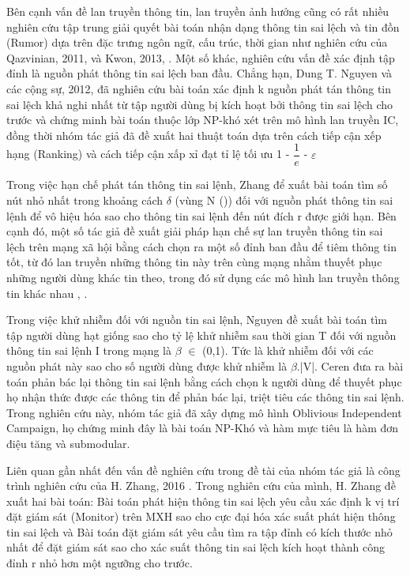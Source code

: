 Bên cạnh vấn đề lan truyền thông tin, lan truyền ảnh hưởng cũng có rất nhiều nghiên cứu tập trung giải quyết bài toán nhận dạng thông tin sai lệch và tin đồn (Rumor) dựa trên đặc trưng ngôn ngữ, cấu trúc, thời gian như nghiên cứu của Qazvinian, 2011, \cite{qazvin} và Kwon, 2013, \cite{kwon}. Một số khác, nghiên cứu vấn đề xác định tập đỉnh là nguồn phát thông tin sai lệch ban đầu. Chẳng hạn, Dung T. Nguyen và các cộng sự, 2012, \cite{nguyen1} đã nghiên cứu bài toán xác định k nguồn phát tán thông tin sai lệch khả nghi nhất từ tập người dùng bị kích hoạt bởi thông tin sai lệch cho trước và chứng minh bài toán thuộc lớp NP-khó xét trên mô hình lan truyền IC, đồng thời nhóm tác giả đã đề xuất hai thuật toán dựa trên cách tiếp cận xếp hạng (Ranking) và cách tiếp cận xấp xỉ đạt tỉ lệ tối ưu 1 - $\dfrac{1}{e}$ - $\varepsilon$

Trong việc hạn chế phát tán thông tin sai lệnh, Zhang \cite{zhang1} để xuất bài toán tìm số nút nhỏ nhất trong khoảng cách $\delta$ (vùng N$_{}$ ()) đối với nguồn phát thông tin sai lệnh để vô hiệu hóa sao cho thông tin sai lệnh đến nút đích r được giới hạn. Bên cạnh đó, một số tác giả đề xuất giải pháp hạn chế sự lan truyền thông tin sai lệch trên mạng xã hội bằng cách chọn ra một số đỉnh ban đầu để tiêm thông tin tốt, từ đó lan truyền những thông tin này trên cùng mạng nhằm thuyết phục những người dùng khác tin theo, trong đó sử dụng các mô hình lan truyền thông tin khác nhau \cite{nguyen9}, \cite{nguyen30}.

Trong việc khử nhiễm đối với nguồn tin sai lệnh, Nguyen \cite{nguyen9} đề xuất bài toán tìm tập người dùng hạt giống sao cho tỷ lệ khử nhiễm sau thời gian T đối với nguồn thông tin sai lệnh I trong mạng là $\beta$ $\in$ (0,1). Tức là khử nhiễm đối với các nguồn phát này sao cho số người dùng được khử nhiễm là $\beta$.|V|. Ceren \cite{ceren} đưa ra bài toán phản bác lại thông tin sai lệnh bằng cách chọn k người dùng để thuyết phục họ nhận thức được các thông tin để phản bác lại, triệt tiêu các thông tin sai lệnh. Trong nghiên cứu này, nhóm tác giả đã xây dựng mô hình Oblivious Independent Campaign, họ chứng minh đây là bài toán NP-Khó và hàm mực tiêu là hàm đơn điệu tăng và submodular.

Liên quan gần nhất đến vấn đề nghiên cứu trong đề tài của nhóm tác giả là công trình nghiên cứu của H. Zhang, 2016 \cite{zhang31}. Trong nghiên cứu của mình, H. Zhang đề xuất hai bài toán: Bài toán phát hiện thông tin sai lệch yêu cầu xác định k vị trí đặt giám sát (Monitor) trên MXH sao cho cực đại hóa xác suất phát hiện thông tin sai lệch và Bài toán đặt giám sát yêu cầu tìm ra tập đỉnh có kích thước nhỏ nhất để đặt giám sát sao cho xác suất thông tin sai lệch kích hoạt thành công đỉnh r nhỏ hơn một ngưỡng cho trước.
